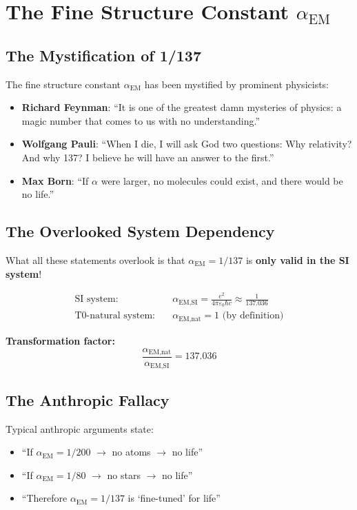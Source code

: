 \documentclass[12pt,a4paper]{article}
\newcommand{\epsilonzero}{\varepsilon_0}
\newcommand{\pichar}{\pi}
\newcommand{\alphaEMSI}{\alpha_{\text{EM,SI}}}
\newcommand{\alphaEMnat}{\alpha_{\text{EM,nat}}}
\begin{document}
	\section{The Fine Structure Constant $\alpha_{\text{EM}}$}
	\label{sec:alpha_em}
	
	\subsection{The Mystification of 1/137}
	\label{subsec:alpha_mystification}
	
	The fine structure constant $\alpha_{\text{EM}}$ has been mystified by prominent physicists:
	
	\begin{itemize}
		\item \textbf{Richard Feynman}: ``It is one of the greatest damn mysteries of physics: a magic number that comes to us with no understanding.''
		\item \textbf{Wolfgang Pauli}: ``When I die, I will ask God two questions: Why relativity? And why 137? I believe he will have an answer to the first.''
		\item \textbf{Max Born}: ``If $\alpha$ were larger, no molecules could exist, and there would be no life.''
	\end{itemize}
	
	\subsection{The Overlooked System Dependency}
	\label{subsec:alpha_system_dependency}
	
	What all these statements overlook is that $\alpha_{\text{EM}} = 1/137$ is \textbf{only valid in the SI system}!
	
	\begin{align}
		\text{SI system:} \quad &\alphaEMSI = \frac{e^2}{4\pichar\epsilonzero\hbar c} \approx \frac{1}{137.036} \\
		\text{T0-natural system:} \quad &\alphaEMnat = 1 \text{ (by definition)}
	\end{align}
	
	\textbf{Transformation factor:}
	$$\frac{\alphaEMnat}{\alphaEMSI} = 137.036$$
	
	\subsection{The Anthropic Fallacy}
	\label{subsec:anthropic_fallacy}
	
	Typical anthropic arguments state:
	\begin{itemize}
		\item ``If $\alpha_{\text{EM}} = 1/200$ $\rightarrow$ no atoms $\rightarrow$ no life''
		\item ``If $\alpha_{\text{EM}} = 1/80$ $\rightarrow$ no stars $\rightarrow$ no life''
		\item ``Therefore $\alpha_{\text{EM}} = 1/137$ is `fine-tuned' for life''
	\end{itemize}
	
\end{document}
